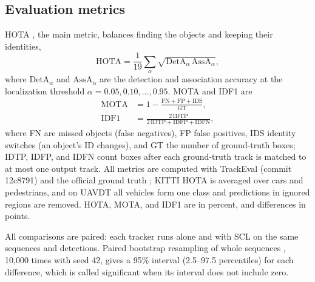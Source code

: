 \documentclass[pdflatex,sn-mathphys-num,iicol]{sn-jnl}
\newcommand{\scl}{SCL}
\begin{document}
\subsection{Evaluation metrics}\label{sec:metrics}
HOTA \cite{luiten2021hota}, the main metric, balances finding the objects and keeping their
identities,
\begin{equation}
\mathrm{HOTA}=\frac{1}{19}\sum_{\alpha}\sqrt{\mathrm{DetA}_\alpha\,\mathrm{AssA}_\alpha},
\label{eq:hota}
\end{equation}
where $\mathrm{DetA}_\alpha$ and $\mathrm{AssA}_\alpha$ are the detection and association accuracy
at the localization threshold $\alpha=0.05,0.10,\dots,0.95$. MOTA \cite{bernardin2008clear} and
IDF1 \cite{ristani2016idf1} are
\begin{align}
\mathrm{MOTA}&=1-\frac{\mathrm{FN}+\mathrm{FP}+\mathrm{IDS}}{\mathrm{GT}},\label{eq:mota}\\
\mathrm{IDF1}&=\frac{2\,\mathrm{IDTP}}{2\,\mathrm{IDTP}+\mathrm{IDFP}+\mathrm{IDFN}},\label{eq:idf1}
\end{align}
where FN are missed objects (false negatives), FP false positives, IDS identity switches (an
object's ID changes), and GT the number of ground-truth boxes; IDTP, IDFP, and IDFN count boxes
after each ground-truth track is matched to at most one output track. All metrics are computed
with TrackEval (commit 12c8791) and the official ground truth \cite{dendorfer2021motchallenge};
KITTI HOTA is averaged over cars and pedestrians, and on UAVDT all vehicles form one class and
predictions in ignored regions are removed. HOTA, MOTA, and IDF1 are in percent, and differences
in points.

All comparisons are paired: each tracker runs alone and with \scl{} on the same sequences and
detections. Paired bootstrap resampling of whole sequences \cite{efron1993bootstrap}, 10,000 times
with seed 42, gives a 95\% interval (2.5--97.5 percentiles) for each difference, which is called
significant when its interval does not include zero.
\end{document}
